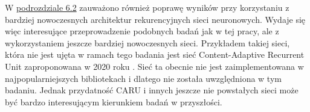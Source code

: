 \documentclass[10pt,a4paper]{article}
\begin{document}
W \hyperlink{subsection.6.2}{podrozdziale 6.2} zauważono również poprawę wyników przy korzystaniu z bardziej nowoczesnych architektur rekurencyjnych sieci neuronowych. Wydaje się więc interesujące przeprowadzenie podobnych badań jak w tej pracy, ale z wykorzystaniem jeszcze bardziej nowoczesnych sieci. Przykładem takiej sieci, która nie jest ujęta w ramach tego badania jest sieć Content-Adaptive Recurrent Unit zaproponowana w 2020 roku \cite{chan2020caru}. Sieć ta obecnie nie jest zaimplementowana w najpopularniejszych bibliotekach i dlatego nie została uwzględniona w tym badaniu. Jednak przydatność CARU i innych jeszcze nie powstałych sieci może być bardzo interesującym kierunkiem badań w przyszłości. 

\newpage
\printbibliography[title=Bibliografia]
\end{document}
